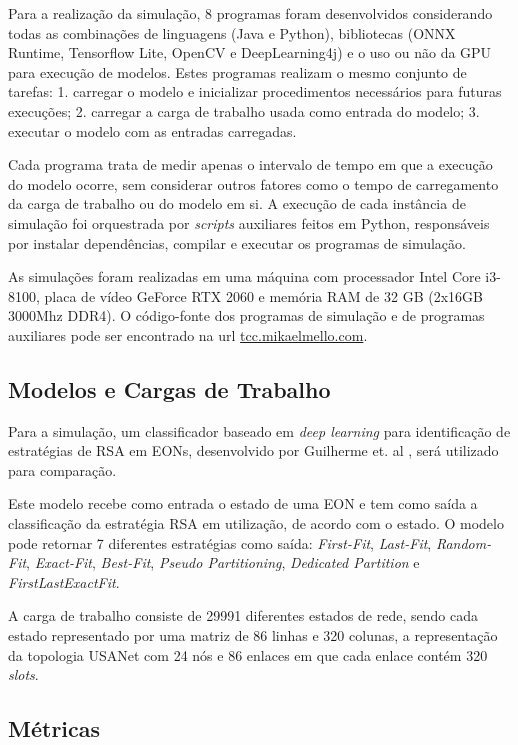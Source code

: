 Para a realização da simulação, 8 programas foram desenvolvidos considerando todas as combinações de linguagens (Java e Python), bibliotecas (ONNX Runtime, Tensorflow Lite, OpenCV e DeepLearning4j) e o uso ou não da GPU para execução de modelos. Estes programas realizam o mesmo conjunto de tarefas: 1. carregar o modelo e inicializar procedimentos necessários para futuras execuções; 2. carregar a carga de trabalho usada como entrada do modelo; 3. executar o modelo com as entradas carregadas.

Cada programa trata de medir apenas o intervalo de tempo em que a execução do modelo ocorre, sem considerar outros fatores como o tempo de carregamento da carga de trabalho ou do modelo em si. A execução de cada instância de simulação foi orquestrada por \textit{scripts} auxiliares feitos em Python, responsáveis por instalar dependências, compilar e executar os programas de simulação.

As simulações foram realizadas em uma máquina com processador Intel Core i3-8100, placa de vídeo GeForce RTX 2060 e memória RAM de 32 GB (2x16GB 3000Mhz DDR4). O código-fonte dos programas de simulação e de programas auxiliares pode ser encontrado na url \url{tcc.mikaelmello.com}.

\subsection{Modelos e Cargas de Trabalho}

Para a simulação, um classificador baseado em \textit{deep learning} para identificação de estratégias de RSA em EONs, desenvolvido por Guilherme et. al \cite{eon_ml_classifier_2020}, será utilizado para comparação.

Este modelo recebe como entrada o estado de uma EON e tem como saída a classificação da estratégia RSA em utilização, de acordo com o estado. O modelo pode retornar 7 diferentes estratégias como saída: \textit{First-Fit}, \textit{Last-Fit}, \textit{Random-Fit}, \textit{Exact-Fit}, \textit{Best-Fit}, \textit{Pseudo Partitioning}, \textit{Dedicated Partition} e \textit{FirstLastExactFit}.

A carga de trabalho consiste de 29991 diferentes estados de rede, sendo cada estado representado por uma matriz de 86 linhas e 320 colunas, a representação da topologia USANet com 24 nós e 86 enlaces em que cada enlace contém 320 \textit{slots}.

\subsection{Métricas}

